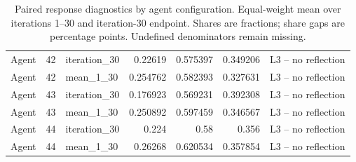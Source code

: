 \begin{table}[htbp!]
\begin{tabular}{lrlrrrl}
Agent & 42 & iteration\_30 & 0.22619 & 0.575397 & 0.349206 & L3 -- no reflection \\
Agent & 42 & mean\_1\_30 & 0.254762 & 0.582393 & 0.327631 & L3 -- no reflection \\
Agent & 43 & iteration\_30 & 0.176923 & 0.569231 & 0.392308 & L3 -- no reflection \\
Agent & 43 & mean\_1\_30 & 0.250892 & 0.597459 & 0.346567 & L3 -- no reflection \\
Agent & 44 & iteration\_30 & 0.224 & 0.58 & 0.356 & L3 -- no reflection \\
Agent & 44 & mean\_1\_30 & 0.26268 & 0.620534 & 0.357854 & L3 -- no reflection \\
\hline
\end{tabular}
\caption{Paired response diagnostics by agent configuration. Equal-weight mean over iterations 1--30 and iteration-30 endpoint. Shares are fractions; share gaps are percentage points. Undefined denominators remain missing.}
\label{chap:results:tab:rq3_agents_agreement}
\end{table}
